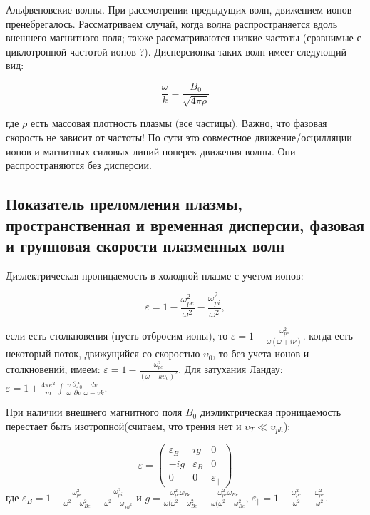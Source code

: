 \documentclass[10pt, a4paper]{article}
\begin{document}
Альфвеновские волны. При рассмотрении предыдущих волн, движением ионов пренебрегалось. Рассматриваем случай, когда волна распространяется вдоль внешнего магнитного поля; также рассматриваются низкие частоты (сравнимые с циклотронной частотой ионов ?). Дисперсионка таких волн имеет следующий вид:

\begin{equation}
    \frac{\omega}{k}=\frac{B_0}{\sqrt{4\pi \rho}}
\end{equation}

где $\rho$ есть массовая плотность плазмы (все частицы). Важно, что фазовая скорость не зависит от частоты! По сути это совместное движение/осцилляции ионов и магнитных силовых линий поперек движения волны. Они распространяются без дисперсии.

\subsection{Показатель преломления плазмы, пространственная и временная дисперсии, фазовая и групповая скорости плазменных волн}

Диэлектрическая проницаемость в холодной плазме с учетом ионов:

\begin{equation}
    \varepsilon=1 - \frac{\omega_{pe}^2}{\omega^2} - \frac{\omega_{pi}^2}{\omega^2},
\end{equation}

если есть столкновения (пусть отбросим ионы), то $\varepsilon=1-\frac{\omega_{pe}^2}{\omega (\omega+i \nu)}$. когда есть некоторый поток, движущийся со скоростью $\upsilon_0$, то без учета ионов и столкновений, имеем: $\varepsilon=1-\frac{\omega_{pe}^2}{(\omega - k \upsilon_0)^2}$.
Для затухания Ландау: $\varepsilon=1+\frac{4\pi e^2}{m} \int \frac{v}{\omega} \frac{\partial f_0}{\partial v} \frac{dv}{\omega-vk}$.

При наличии внешнего магнитного поля $B_0$ диэликтрическая проницаемость перестает быть изотропной(считаем, что трения нет и $\upsilon_T \ll \upsilon_{ph}$):

\begin{equation}
    \varepsilon=
    \begin{pmatrix}
        \varepsilon_B & ig & 0 \\
        -ig & \varepsilon_B & 0 \\
        0 & 0 & \varepsilon_{\parallel}
    \end{pmatrix}
\end{equation}
 где $\varepsilon_B=1-\frac{\omega_{pe}^2}{\omega^2-\omega_{Be}^2}-\frac{\omega_{pi}^2}{\omega^2-\omega_{Bi^2}}$ и $g=\frac{\omega_{pe}^2 \omega_{Be}}{\omega (\omega^2-\omega_{Be}^2} -\frac{\omega_{pe}^2 \omega_{Be}}{\omega (\omega^2-\omega_{Be}^2}$, $\varepsilon_{\parallel}=1-\frac{\omega_{pe}^2}{\omega^2}-\frac{\omega_{pe}^2}{\omega^2}$. 
\end{document}
